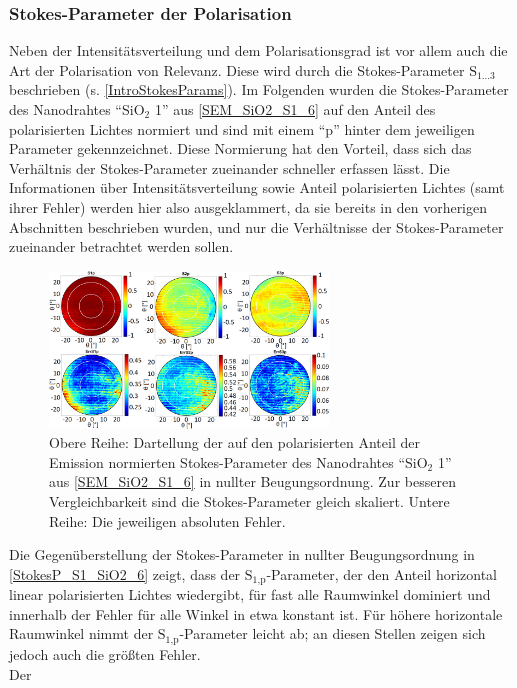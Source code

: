 \subsubsection{Stokes-Parameter der Polarisation} Neben der
Intensitätsverteilung und dem Polarisationsgrad ist vor allem auch die Art der
Polarisation von Relevanz. Diese wird durch die Stokes-Parameter
$\text{S}_{\text{1} \ldots \text{3}}$ beschrieben (s.
\autoref{IntroStokesParams}). Im Folgenden wurden die Stokes-Parameter des
Nanodrahtes ``SiO$_\text{2}$ 1'' aus \autoref{SEM_SiO2_S1_6} auf den Anteil des
polarisierten Lichtes normiert und sind mit einem ``p'' hinter dem jeweiligen
Parameter gekennzeichnet. Diese Normierung hat den Vorteil, dass sich das
Verhältnis der Stokes-Parameter zueinander schneller erfassen lässt. Die
Informationen über Intensitätsverteilung sowie Anteil polarisierten Lichtes
(samt ihrer Fehler) werden hier also ausgeklammert, da sie bereits in den
vorherigen Abschnitten beschrieben wurden, und nur die Verhältnisse der
Stokes-Parameter zueinander betrachtet werden sollen.\begin{figure}[b]
\centering \includegraphics[width=0.66\textwidth]{Bilder/SiO2/StokesP_S1_Si02_6}
\caption{Obere Reihe: Dartellung der auf den polarisierten Anteil der Emission
normierten Stokes-Parameter des Nanodrahtes ``SiO$_\text{2}$ 1'' aus
\autoref{SEM_SiO2_S1_6} in nullter Beugungsordnung. Zur besseren
Vergleichbarkeit sind die Stokes-Parameter gleich skaliert. Untere Reihe: Die
jeweiligen absoluten Fehler.} \label{StokesP_S1_SiO2_6} \end{figure}Die
Gegenüberstellung der Stokes-Parameter in nullter Beugungsordnung in
\autoref{StokesP_S1_SiO2_6} zeigt, dass der $\text{S}_\text{1,p}$-Parameter, der
den Anteil horizontal linear polarisierten Lichtes wiedergibt, für fast alle
Raumwinkel dominiert und innerhalb der Fehler für alle Winkel in etwa konstant
ist. Für höhere horizontale Raumwinkel nimmt der $\text{S}_\text{1,p}$-Parameter
leicht ab; an diesen Stellen zeigen sich jedoch auch die größten Fehler.\\ Der
